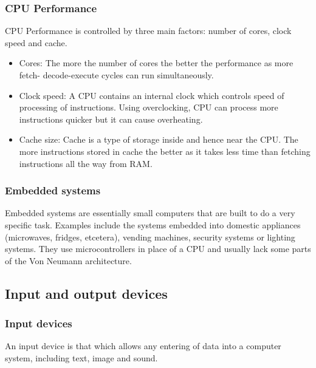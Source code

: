 \documentclass{article}
\begin{document}
\subsubsection{CPU Performance}
CPU Performance is controlled by three main factors: number of cores, clock speed and 
cache.

\begin{itemize}
	\item Cores: The more the number of cores the better the performance as more fetch-
		decode-execute cycles can run simultaneously.
	\item Clock speed: A CPU contains an internal clock which controls speed of 
		processing of instructions. Using overclocking, CPU can process more instructions
		quicker but it can cause overheating.
	\item Cache size: Cache is a type of storage inside and hence near the CPU. 
		The more instructions stored in cache the better as it takes less time than 
		fetching instructions all the way from RAM.
\end{itemize}

\subsubsection{Embedded systems}
Embedded systems are essentially small computers that are built to do a very specific 
task. Examples include the systems embedded into domestic appliances (microwaves, 
fridges, etcetera), vending machines, security systems or lighting systems. They use
microcontrollers in place of a CPU and usually lack some parts of the Von Neumann 
architecture.

\subsection{Input and output devices}

\subsubsection{Input devices}
An input device is that which allows any entering of data into a computer system, 
including text, image and sound. 
\end{document}

